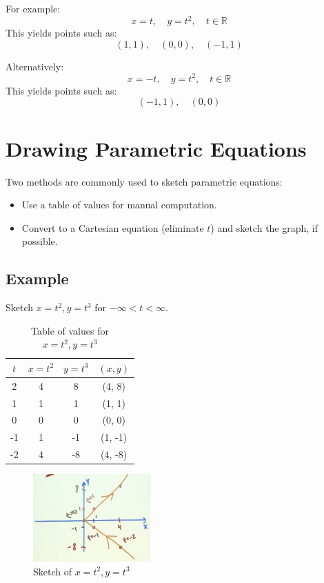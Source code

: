 \documentclass{article}
\begin{document}
For example:
\[ x = t, \quad y = t^2, \quad t \in \mathbb{R} \]
This yields points such as:
\[ (1, 1), \quad (0, 0), \quad (-1, 1) \]

Alternatively:
\[ x = -t, \quad y = t^2, \quad t \in \mathbb{R} \]
This yields points such as:
\[ (-1, 1), \quad (0, 0) \]

\section*{Drawing Parametric Equations}

\begin{tcolorbox}[colframe=RedOrange, colback=orange!5!white, title=Methods to Sketch Parametric Equations]
Two methods are commonly used to sketch parametric equations:
\begin{itemize}
    \item Use a table of values for manual computation.
    \item Convert to a Cartesian equation (eliminate $t$) and sketch the graph, if possible.
\end{itemize}
\end{tcolorbox}

\subsection*{Example}
\begin{tcolorbox}[colframe=RoyalBlue, colback=blue!5!white, title=Example Problem]
Sketch $x = t^2, y = t^3$ for $-\infty < t < \infty$.
\end{tcolorbox}

\begin{table}[H]
\centering
\begin{tabular}{|c|c|c|c|}
\hline
$t$ & $x = t^2$ & $y = t^3$ & $(x, y)$ \\
\hline
2 & 4 & 8 & (4, 8) \\
\hline
1 & 1 & 1 & (1, 1) \\
\hline
0 & 0 & 0 & (0, 0) \\
\hline
-1 & 1 & -1 & (1, -1) \\
\hline
-2 & 4 & -8 & (4, -8) \\
\hline
\end{tabular}
\caption{Table of values for $x = t^2, y = t^3$}
\end{table}

\begin{figure}[H]
\centering
\includegraphics[width=0.4\textwidth]{sketching_example1.jpg}
\caption{Sketch of $x = t^2, y = t^3$}
\label{fig:sketch_example1}
\end{figure}
\end{document}
